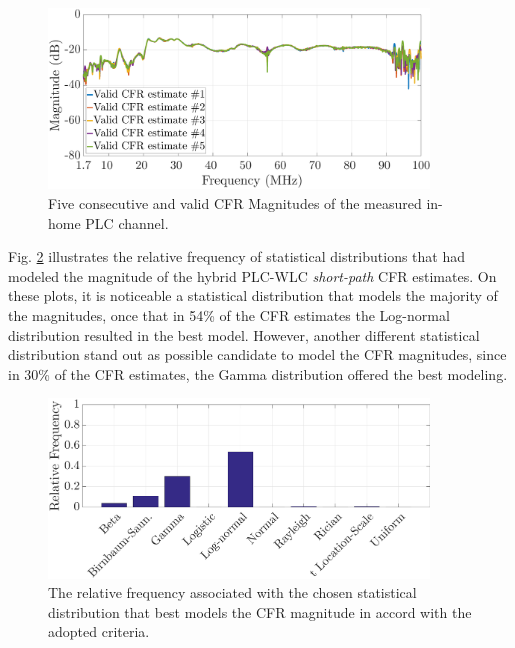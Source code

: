 \begin{figure}[h]
	\centering
	\includegraphics[width=0.9\textwidth]{images/respfreqsW.eps}
	\caption{Five consecutive and valid CFR Magnitudes of the measured in-home PLC channel.}
	\label{respfreqsW}
\end{figure}

Fig. \ref{MAG_percentsW} illustrates the relative frequency of statistical distributions that had modeled the magnitude of the hybrid \ac{PLC}-\ac{WLC} \textit{short-path} \ac{CFR} estimates. On these plots, it is noticeable a statistical distribution that models the majority of the magnitudes, once that in 54\% of the \ac{CFR} estimates the Log-normal distribution resulted in the best model. However, another different statistical distribution stand out as possible candidate to model the \ac{CFR} magnitudes, since in 30\% of the \ac{CFR} estimates, the Gamma distribution offered the best modeling. 

\begin{figure}[h!]
	\centering
	\includegraphics[width=0.9\textwidth]{images/MAG_percentsW.eps}
	\caption{The relative frequency associated with the chosen statistical distribution that best models the CFR magnitude in accord with the adopted criteria.}
	\label{MAG_percentsW}
\end{figure}

